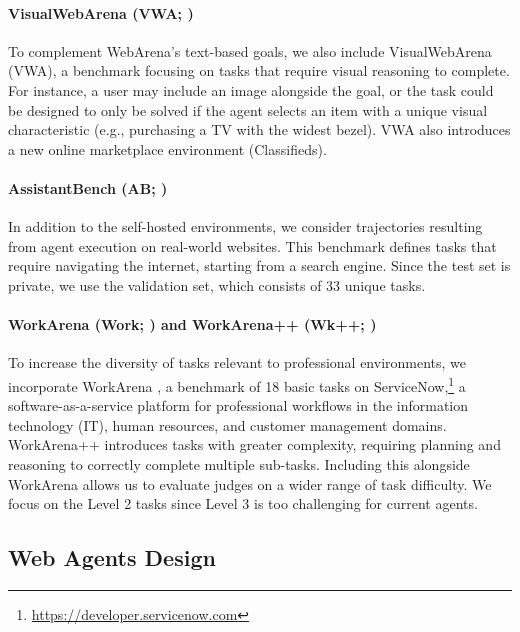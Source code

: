 \documentclass{article} %
\newcommand{\hide}[1]{}
\begin{document}
\paragraph{VisualWebArena (VWA; \citealt{koh_visualwebarena_2024})}
To complement WebArena's text-based goals, we also include VisualWebArena (VWA), a benchmark focusing on tasks that require visual reasoning to complete. For instance, a user may include an image alongside the goal\hide{(e.g., buy a TV with the brand matching an image, which may be a Samsung phone)}, or the task could be designed to only be solved if the agent selects an item with a unique visual characteristic (e.g., purchasing a TV with the widest bezel). VWA also introduces a new online marketplace environment (Classifieds).

\paragraph{AssistantBench (AB; \citealt{assistantbench_2024})}
In addition to the self-hosted environments, we consider trajectories resulting from agent execution on real-world websites. This benchmark defines tasks that require navigating the internet, starting from a search engine. Since the test set is private, we use the validation set, which consists of 33 unique tasks.

\paragraph{WorkArena (Work; \citealt{workarena_l1}) and WorkArena++ (Wk++; \citealt{workarena_l2})}
To increase the diversity of tasks relevant to professional environments, we incorporate WorkArena \citep{workarena_l2}, a benchmark of 18 basic tasks on ServiceNow,\footnote{\url{https://developer.servicenow.com}} a software-as-a-service platform for professional workflows in the information technology (IT), human resources, and customer management domains.
WorkArena++ introduces tasks with greater complexity, requiring planning and reasoning to correctly complete multiple sub-tasks. Including this alongside WorkArena allows us to evaluate judges on a wider range of task difficulty. We focus on the Level 2 tasks since Level 3 is too challenging for current agents.


\subsection{Web Agents Design}
\label{sec:web_agents_design}
\end{document}

